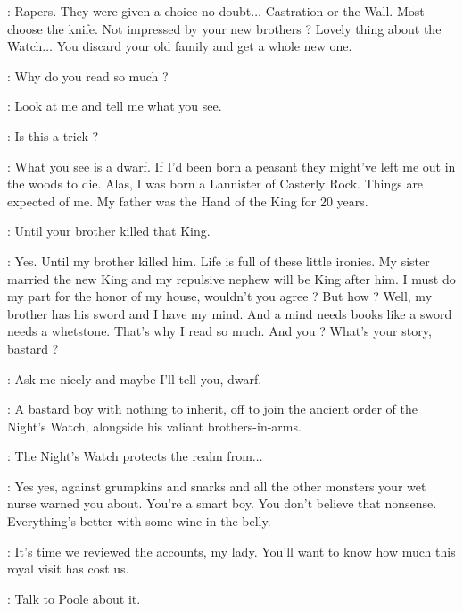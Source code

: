 \scene



\TYRION: Rapers. They were given a choice no doubt$\ldots$ Castration or the Wall. Most choose the knife. Not impressed by your new brothers ? Lovely thing about the Watch$\ldots$ You discard your old family and get a whole new one. 

\JON: Why do you read so much ? 

\TYRION: Look at me and tell me what you see. 

\JON: Is this a trick ? 

\TYRION: What you see is a dwarf. If I'd been born a peasant they might've left me out in the woods to die. Alas, I was born a Lannister of Casterly Rock. Things are expected of me. My father was the Hand of the King for 20 years. 

\JON: Until your brother killed that King. 

\TYRION: Yes. Until my brother killed him. Life is full of these little ironies. My sister married the new King and my repulsive nephew will be King after him. I must do my part for the honor of my house, wouldn't you agree ? But how ? Well, my brother has his sword and I have my mind. And a mind needs books like a sword needs a whetstone. That's why I read so much. And you ? What's your story, bastard ? 

\JON: Ask me nicely and maybe I'll tell you, dwarf. 

\TYRION: A bastard boy with nothing to inherit, off to join the ancient order of the Night's Watch, alongside his valiant brothers-in-arms. 

\JON: The Night's Watch protects the realm from$\ldots$ 

\TYRION: Yes yes, against grumpkins and snarks and all the other monsters your wet nurse warned you about. You're a smart boy. You don't believe that nonsense. Everything's better with some wine in the belly. 

\scene



\LUWIN: It's time we reviewed the accounts, my lady. You'll want to know how much this royal visit has cost us. 

\CATELYN: Talk to Poole about it. 

